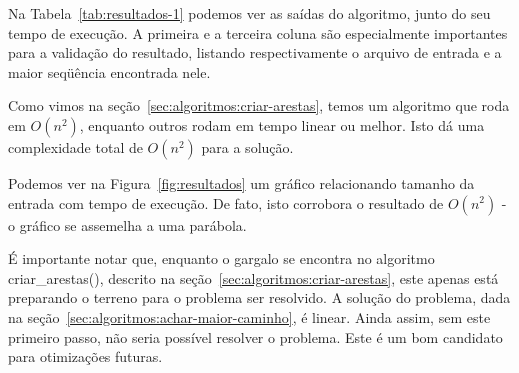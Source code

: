 \documentclass[12pt]{article}
\begin{document}
Na Tabela~\ref{tab:resultados-1} podemos ver as saídas do algoritmo, junto do seu tempo de execu\c{c}ão. A primeira e a terceira coluna são especialmente importantes para a valida\c{c}ão do resultado, listando respectivamente o arquivo de entrada e a maior seqüência encontrada nele.

Como vimos na se\c{c}ão~\ref{sec:algoritmos:criar-arestas}, temos um algoritmo que roda em $O(n^2)$, enquanto outros rodam em tempo linear ou melhor. Isto dá uma complexidade total de $O(n^2)$ para a solu\c{c}ão.

Podemos ver na Figura~\ref{fig:resultados} um gráfico relacionando tamanho da entrada com tempo de execu\c{c}ão. De fato, isto corrobora o resultado de $O(n^2)$ - o gráfico se assemelha a uma parábola.

É importante notar que, enquanto o gargalo se encontra no algoritmo {\sf criar\_arestas()}, descrito na se\c{c}ão~\ref{sec:algoritmos:criar-arestas}, este apenas está preparando o terreno para o problema ser resolvido. A solu\c{c}ão do problema, dada na se\c{c}ão~\ref{sec:algoritmos:achar-maior-caminho}, é linear. Ainda assim, sem este primeiro passo, não seria possível resolver o problema. Este é um bom candidato para otimiza\c{c}ões futuras.
\end{document}
